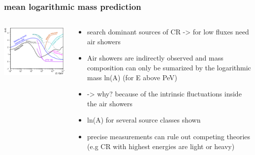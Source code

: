 \documentclass[aspectratio=1610, 9pt]{beamer}
\begin{document}
\begin{frame}\frametitle{mean logarithmic mass prediction}
  \begin{columns}
    \begin{column}[c]{0.48\textwidth}
      \includegraphics{lnA_left.png}
    \end{column}
    \begin{column}[c]{0.48\textwidth}
      \begin{itemize}
        \item search dominant sources of CR -> for low fluxes need air showers
        \item Air showers are indirectly observed and mass composition can only be sumarized by the logarithmic mass ln(A) (for E above PeV)
        \item -> why? because of the intrinsic fluctuations inside the air showers
        \item ln(A) for several source classes shown
        \item precise measurements can rule out competing theories (e.g CR with highest energies are light or heavy)
      \end{itemize}
    \end{column}
  \end{columns}
\end{frame}
\end{document}
